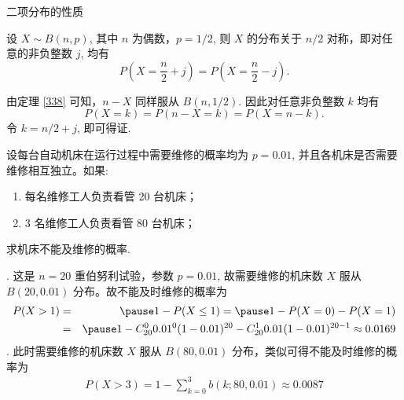 \begin{frame}{二项分布的性质}

	\begin{thm} 设 $X\sim B (n,p)$, 其中 $n$ 为偶数，$p=1/2$, 则 $X$ 的分布关于 $n/2$ 对称，即对任意的非负整数 $j$, 均有
		$$P(X=\frac{n}{2}+j)=P(X=\frac{n}{2}-j).$$
	\end{thm}
	\pause

	\begin{jieda} 由定理 \ref{338} 可知，$n-X$ 同样服从 $B (n,1/2)$. \pause 因此对任意非负整数 $k$ 均有
		$$P(X=k)=P(n-X=k)=P(X=n-k).$$
		\pause
		令 $k=n/2+j$, 即可得证. %
	\end{jieda}

\end{frame}






\begin{frame}
	\vspace{0.4cm}
	\begin{exam}
		设每台自动机床在运行过程中需要维修的概率均为 $p=0.01$, 并且各机床是否需要维修相互独立。如果:
		\begin{enumerate}
			\item 每名维修工人负责看管 20 台机床；
			\item 3 名维修工人负责看管 80 台机床；
		\end{enumerate}
		求机床不能及维修的概率.
	\end{exam}

	\pause {}. 这是 $n=20$ 重伯努利试验，参数 $p=0.01$, 故需要维修的机床数 $X$ 服从 $B (20,0.01)$ 分布。故不能及时维修的概率为 \pause
	\begin{eqnarray*}
		P(X>1)&=&\pause 1-P(X\le 1)=\pause 1-P(X=0)-P(X=1)\\
		&=&\pause 1-C_{20}^00.01^0(1-0.01)^{20}-C_{20}^10.01(1-0.01)^{20-1}\approx 0.0169
	\end{eqnarray*}
	. 此时需要维修的机床数 $X$ 服从 $B (80,0.01)$ 分布，类似可得不能及时维修的概率为
	\begin{eqnarray*}
		P(X>3)=1-\sum_{k=0}^3b(k;80,0.01)\approx 0.0087
	\end{eqnarray*}

\end{frame}

